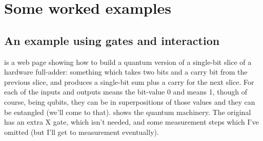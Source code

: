 
\chapter{Some worked examples}

\section{An example using gates and interaction}

\citep{quantumfulladderquantumdaily} is a web page showing how to build a quantum version of a single-bit slice of a hardware full-adder: something which takes two bits and a carry bit from the previous slice, and produces a single-bit sum plus a carry for the next slice. For each of the inputs and outputs \zero{} means the bit-value 0 and \one{} means 1, though of course, being qubits, they can be in superpositions of those values and they can be entangled (we'll come to that).  shows the quantum machinery. The original has an extra X gate, which isn't needed, and some measurement steps which I've omitted (but I'll get to measurement eventually).

